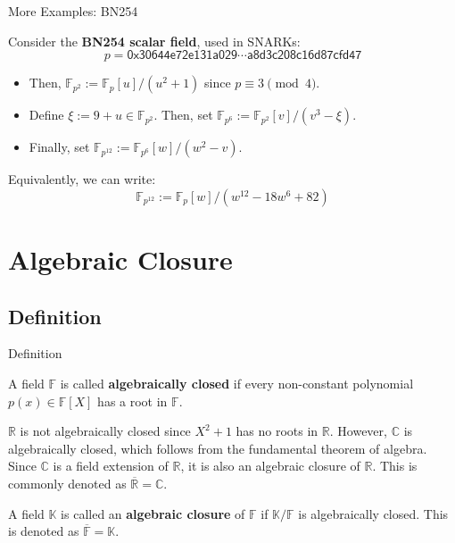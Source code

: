 \documentclass{beamer}
\begin{document}
    \begin{frame}{More Examples: BN254}
        \begin{example}
            Consider the \textbf{BN254 scalar field}, used in SNARKs:
            \begin{equation*}
                p = \mathsf{0x30644e72e131a029\cdots a8d3c208c16d87cfd47}
            \end{equation*}
            \begin{itemize}
                \item Then, $\mathbb{F}_{p^2} := \mathbb{F}_p[u]/(u^2+1)$ since $p \equiv 3 \pmod{4}$.\pause
                \item Define $\xi := 9+u \in \mathbb{F}_{p^2}$. Then, set $\mathbb{F}_{p^6}:=\mathbb{F}_{p^2}[v]/(v^3-\xi)$.\pause
                \item Finally, set $\mathbb{F}_{p^{12}} := \mathbb{F}_{p^6}[w]/(w^2-v)$.\pause
            \end{itemize}

            Equivalently, we can write:
            \begin{equation*}
                \mathbb{F}_{p^{12}} := \mathbb{F}_p[w]/(w^{12}-18w^6+82)
            \end{equation*}
        \end{example}
    \end{frame}

    \section{Algebraic Closure}
    \subsection{Definition}

    \begin{frame}{Definition}
        \begin{definition}
            A field $\mathbb{F}$ is called \textbf{algebraically closed} if every non-constant polynomial $p(x) \in \mathbb{F}[X]$ has a root in $\mathbb{F}$.\pause
        \end{definition}
        
        \begin{example}
            $\mathbb{R}$ is not algebraically closed since $X^2+1$ has no roots in $\mathbb{R}$. However, $\mathbb{C}$ is algebraically closed, which follows from the fundamental theorem of algebra. Since $\mathbb{C}$ is a field extension of $\mathbb{R}$, it is also an algebraic closure of $\mathbb{R}$. This is commonly denoted as $\overline{\mathbb{R}} = \mathbb{C}$.\pause
        \end{example}

        \begin{definition}
            A field $\mathbb{K}$ is called an \textbf{algebraic closure} of $\mathbb{F}$ if $\mathbb{K}/\mathbb{F}$ is algebraically closed. This is denoted as $\overline{\mathbb{F}} = \mathbb{K}$.
        \end{definition}
    \end{frame}
\end{document}
